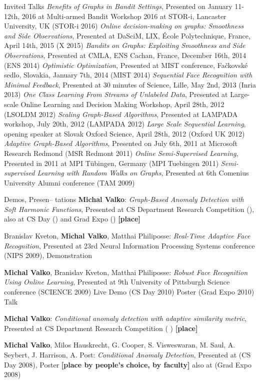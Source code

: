 \documentclass{resume}
\begin{document}
\begin{category}{Invited Talks}
\citembullet
\emph{Benefits of Graphs in Bandit Settings}, Presented on January 11-12th, 2016 at Multi-armed Bandit Workshop 2016 at STOR-i, Lancaster University, UK 
({\sf STOR-i 2016})
\citembullet
\emph{Online decision-making on graphs: Smoothness and Side Observations},
 Presented  at DaSciM, LIX, \'Ecole Polytechnique, France, April 14th, 2015 
({\sf X 2015})
\citembullet
\emph{Bandits on Graphs: Exploiting Smoothness and Side Observations},
 Presented  at CMLA, ENS Cachan, France, December 16th, 2014 
({\sf ENS 2014})
\citembullet
  \emph{Optimistic Optimization},
 Presented  at MIST conference, Fa\v ckovsk\' e sedlo, Slovakia, January 7th, 2014
({\sf MIST 2014})
\citembullet
\emph{Sequential Face Recognition with Minimal Feedback},
Presented at 30 minutes of Science, Lille, May 2nd, 2013 ({\sf Inria 2013})
\citembullet
 \emph{One Class Learning From Streams of Unlabeled Data},
Presented at Large-scale Online Learning and Decision Making Workshop,
April 28th, 2012 ({\sf LSOLDM 2012})
\citembullet
 \emph{Scaling Graph-Based Algorithms}, Presented at
LAMPADA workshop, July 20th, 2012 ({\sf LAMPADA 2012})
\citembullet
\emph{Large Scale Sequential Learning}, opening speaker at
Slovak Oxford Science, April 28th, 2012 ({\sf Oxford UK 2012})
\citembullet
 \emph{Adaptive Graph-Based Algorithms}, Presented on July
6th, 2011 at Microsoft Research Redmond ({\sf MSR Redmont 2011})
\citembullet
 \emph{Online Semi-Supervised Learning}, Presented in 2011
at MPI T\"{u}bingen, Germany ({\sf MPI Tuebingen 2011})
\citembullet
 \emph{Semi-supervised Learning with Random Walks on
Graphs}, Presented at 6th Comenius University Alumni conference ({\sf TAM 2009})
\end{category}

\begin{category}{Demos, Presen-- tations}
\citembullet
{\bf Michal Valko}:  \emph{Graph-Based Anomaly Detection with Soft Harmonic
Functions}, Presented at
CS Department Research Competition  ({}), also at CS Day ({})
and  Grad Expo ({}) {\bf [\first place]}

\citembullet
Branislav Kveton, {\bf  Michal Valko}, Matthai Philiposse:  \emph{Real-Time
Adaptive Face Recognition}, Presented at
23rd Neural Information Processing Systems conference ({\sf NIPS 2009}),
Demonstration

\citembullet
{\bf  Michal Valko}, Branislav Kveton, Matthai Philiposse:  \emph{Robust Face
Recognition Using Online Learning}, Presented at
9th University of Pittsburgh Science conference ({\sf SCIENCE 2009}) Live Demo
({\sf CS Day 2010}) Poster ({\sf Grad Expo 2010}) Talk

\citembullet
{\bf Michal Valko}:  \emph{Conditional anomaly detection with adaptive
similarity metric}, Presented at
CS Department Research Competition  ({ }) {\bf [\first place]}

\citembullet
{\bf Michal Valko}, Milos Hauskrecht, G. Cooper, S. Visweswaran, M. Saul, A.
Seybert,  J. Harrison, A. Post:
\emph{Conditional Anomaly Detection}, Presented at ({\sf CS Day 2008}), Poster
 {\bf[\first  place by people's choice, \second by faculty]} also at ({\sf Grad
Expo 2008})
 \end{category}
\end{document}
